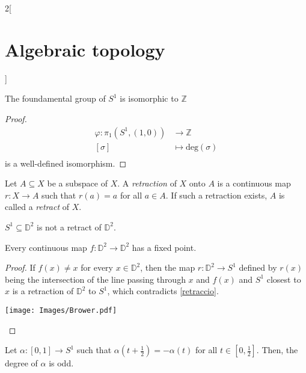 \documentclass[../../../main.tex]{subfiles}
\begin{document}
\begin{multicols}{2}[\section{Algebraic topology}]
	\begin{theorem}
		The foundamental group of $S^1$ is isomorphic to $\mathbb{Z}$
	\end{theorem}
	
	\begin{proof}
		\begin{align*}
			\varphi: \pi_1(S^1, (1,0)) &\longrightarrow \mathbb{Z} \\
			[\sigma]&\longmapsto \text{deg}(\sigma) \\
		\end{align*}
		is a well-defined isomorphism.
	\end{proof}
	
	\begin{definition}
		Let $A\subseteq X$ be a subspace of $X$. A \emph{retraction} of $X$ onto $A$ is a continuous map $r: X \to A$ such that $r(a)=a$ for all $a\in A$. If such a retraction exists, $A$ is called a \emph{retract} of $X$. 
	\end{definition}

	\begin{corollary}\label{retraccio}
		$S^1\subseteq \mathbb{D}^2$ is not a retract of $\mathbb{D}^2$.
	\end{corollary}


	\begin{theorem}
		\label{Brower}
		Every continuous map $f:\mathbb{D}^2 \to \mathbb{D}^2$ has a fixed point. 
	\end{theorem}

	\begin{proof}
		
		\begin{minipage}{0.3\textwidth}
			If $f(x)\neq x$ for every $x\in \mathbb{D}^2$, then the map $r: \mathbb{D}^2 \to S^1$ defined by $r(x)$ being the intersection of the line passing through $x$ and $f(x)$ and $S^1$ closest to $x$ is a retraction of $\mathbb{D}^2$ to $S^1$, which contradicts \cref{retraccio}.
		\end{minipage}
		\begin{minipage}{0.2\textwidth}
			\begin{center}
				\texttt{[image: Images/Brower.pdf]}
			\end{center}
		\end{minipage}

	\end{proof}
	
	\begin{lemma} \label{lema Borsuk}
		Let $\alpha:[0,1]\to S^1$ such that $\alpha(t+\frac{1}{2})=-\alpha(t)$ for all $t\in[0,\frac{1}{2}]$. Then, the degree of $\alpha$ is odd.
	\end{lemma}


\end{multicols}
\end{document}
